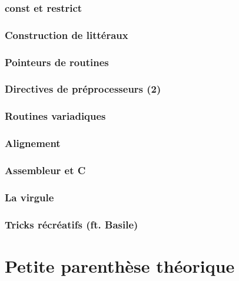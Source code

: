 \documentclass{minitelreport}
\begin{document}
\begin{refsection}
		\section{const et restrict}
			\label{sec:const_et_restrict}
			
		\section{Construction de littéraux}
			\label{sec:construction_de_litt_raux}
			
		\section{Pointeurs de routines}
			\label{sec:pointeurs_de_routines}
			
		\section{Directives de préprocesseurs (2)}
			\label{sec:directives_de_pr_processeurs_2_}
			
		\section{Routines variadiques}
			\label{sec:routines_variadiques}
			
		\section{Alignement}
			\label{sec:alignement}
			
		\section{Assembleur et C}
			\label{sec:assembleur_et_c}
			
		\section{La virgule}
			\label{sec:la_virgule}
			
		\section{Tricks récréatifs (ft. Basile)}
			\label{sec:tricks_r_cr_atifs_ft_basile_}
			
\part{Petite parenthèse théorique}
\label{part:petite_parenthèse_théorique}

\end{refsection}
\end{document}
